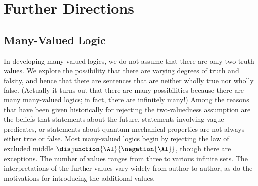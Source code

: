 
\chapter{Further Directions}\label{furtherdirections}

\section{Many-Valued Logic}

In developing many-valued logics, we do not assume that there are only two truth values.  We explore the possibility that there are varying degrees of truth and falsity, and hence that there are sentences that are neither wholly true nor wholly false.
(Actually it turns out that there are many possibilities because there are many many-valued logics; in fact, there are infinitely many!) 
Among the reasons that have been given historically for rejecting the two-valuedness assumption are the beliefs that statements about the future, statements involving vague predicates, or statements about quantum-mechanical properties are not always either true or false. 
Most many-valued logics begin by rejecting the law of excluded middle $\disjunction{\Al}{\negation{\Al}}$, though there are exceptions. 
The number of values ranges from three to various infinite sets. 
The interpretations of the further values vary widely from author to author, as do the motivations for introducing the additional values. 


